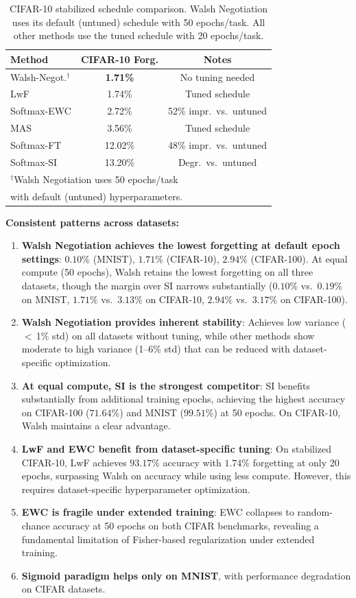 \documentclass[preprint,review,12pt]{elsarticle}
\begin{document}
\begin{table}[h]
\centering
\caption{CIFAR-10 stabilized schedule comparison. Walsh Negotiation uses its default (untuned) schedule with 50 epochs/task. All other methods use the tuned schedule with 20 epochs/task.}
\label{tab:cifar10_stabilized_comparison}
\begin{tabular}{lcc}
\toprule
Method & CIFAR-10 Forg. & Notes \\
\midrule
Walsh-Negot.$^\dagger$ & \textbf{1.71\%} & No tuning needed \\
LwF & 1.74\% & Tuned schedule \\
Softmax-EWC & 2.72\% & 52\% impr.\ vs.\ untuned \\
MAS & 3.56\% & Tuned schedule \\
Softmax-FT & 12.02\% & 48\% impr.\ vs.\ untuned \\
Softmax-SI & 13.20\% & Degr.\ vs.\ untuned \\
\bottomrule
\multicolumn{3}{l}{\scriptsize $^\dagger$Walsh Negotiation uses 50 epochs/task} \\
\multicolumn{3}{l}{\scriptsize with default (untuned) hyperparameters.}
\end{tabular}
\end{table}

\textbf{Consistent patterns across datasets:}
\begin{enumerate}
\item \textbf{Walsh Negotiation achieves the lowest forgetting at default epoch settings}: $0.10\%$ (MNIST), $1.71\%$ (CIFAR-10), $2.94\%$ (CIFAR-100). At equal compute (50 epochs), Walsh retains the lowest forgetting on all three datasets, though the margin over SI narrows substantially ($0.10\%$ vs.\ $0.19\%$ on MNIST, $1.71\%$ vs.\ $3.13\%$ on CIFAR-10, $2.94\%$ vs.\ $3.17\%$ on CIFAR-100).
\item \textbf{Walsh Negotiation provides inherent stability}: Achieves low variance ($<$\,1\% std) on all datasets without tuning, while other methods show moderate to high variance (1--6\% std) that can be reduced with dataset-specific optimization.
\item \textbf{At equal compute, SI is the strongest competitor}: SI benefits substantially from additional training epochs, achieving the highest accuracy on CIFAR-100 ($71.64\%$) and MNIST ($99.51\%$) at 50 epochs. On CIFAR-10, Walsh maintains a clear advantage.
\item \textbf{LwF and EWC benefit from dataset-specific tuning}: On stabilized CIFAR-10, LwF achieves $93.17\%$ accuracy with $1.74\%$ forgetting at only 20 epochs, surpassing Walsh on accuracy while using less compute. However, this requires dataset-specific hyperparameter optimization.
\item \textbf{EWC is fragile under extended training}: EWC collapses to random-chance accuracy at 50 epochs on both CIFAR benchmarks, revealing a fundamental limitation of Fisher-based regularization under extended training.
\item \textbf{Sigmoid paradigm helps only on MNIST}, with performance degradation on CIFAR datasets.
\end{enumerate}
\end{document}
